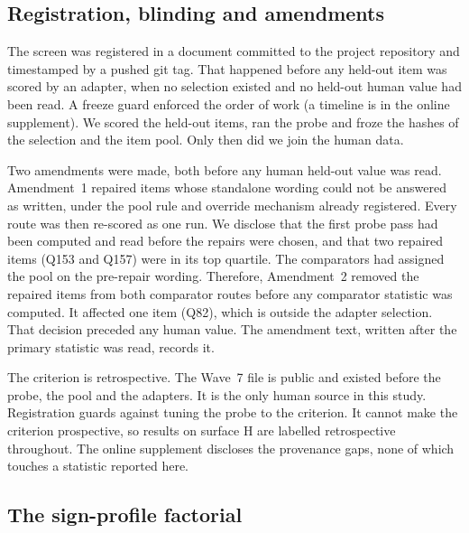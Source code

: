 \subsection{Registration, blinding and amendments}\label{sec:design-prereg}

The screen was registered in a document committed to the project repository and timestamped by a pushed git tag. That happened before any held-out item was scored by an adapter, when no selection existed and no held-out human value had been read. A freeze guard enforced the order of work (a timeline is in the online supplement). We scored the held-out items, ran the probe and froze the hashes of the selection and the item pool. Only then did we join the human data.

Two amendments were made, both before any human held-out value was read. Amendment~1 repaired  items whose standalone wording could not be answered as written, under the pool rule and override mechanism already registered. Every route was then re-scored as one run. We disclose that the first probe pass had been computed and read before the repairs were chosen, and that two repaired items (Q153 and Q157) were in its top quartile. The comparators had assigned the pool on the pre-repair wording. Therefore, Amendment~2 removed the repaired items from both comparator routes before any comparator statistic was computed. It affected one item (Q82), which is outside the adapter selection. That decision preceded any human value. The amendment text, written after the primary statistic was read, records it.

The criterion is retrospective. The Wave~7 file is public and existed before the probe, the pool and the adapters. It is the only human source in this study. Registration guards against tuning the probe to the criterion. It cannot make the criterion prospective, so results on surface H are labelled retrospective throughout. The online supplement discloses the provenance gaps, none of which touches a statistic reported here.

\subsection{The sign-profile factorial}\label{sec:design-factorial}

